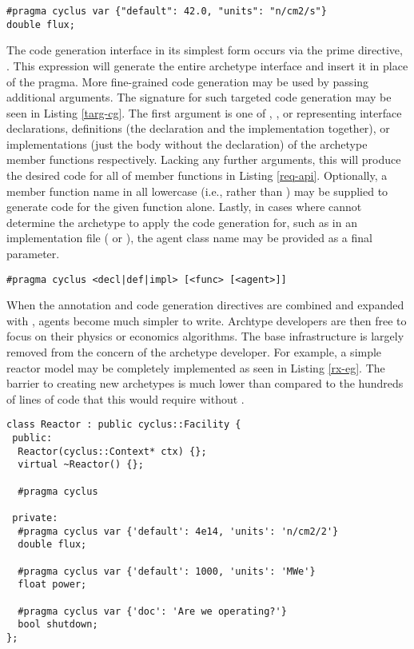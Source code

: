 \begin{lstlisting}[caption={Flux State Variable Annotation}, label=flux-pragma]
#pragma cyclus var {"default": 42.0, "units": "n/cm2/s"}
double flux;
\end{lstlisting}

The code generation interface in its simplest form occurs via the \cyclus 
prime directive, .  This expression will 
generate the entire archetype interface and insert it in place of the pragma.
More fine-grained code generation may be used by passing additional arguments.
The signature for such targeted code generation may be seen in Listing \ref{targ-cg}.
The first argument is one of , , or  representing 
interface declarations, definitions (the declaration and the implementation together), 
or implementations (just the body without the declaration) of the archetype member
functions respectively. Lacking any further arguments, this will produce the desired code for 
all of member functions in Listing \ref{req-api}.  Optionally, a member function 
name in all lowercase (i.e.,  rather than ) may 
be supplied to generate code for the given function alone.  Lastly, in 
cases where \cycpp cannot determine the archetype to apply the code generation for,
such as in an implementation file ( or ), the agent
class name may be provided as a final parameter.

\begin{lstlisting}[caption={Targeted Code Generation Directive Signatures}, 
                   label=targ-cg]
#pragma cyclus <decl|def|impl> [<func> [<agent>]]
\end{lstlisting}

When the annotation and code generation directives are combined and expanded with 
\cycpp, agents become much simpler to write.
Archtype developers are then free to focus on their physics 
or economics algorithms. The base \cyclus
infrastructure is largely removed from the concern of the archetype developer.
For example, a simple reactor model may be completely implemented as seen in 
Listing \ref{rx-eg}. The barrier to creating new archetypes is much lower than 
compared to the hundreds of lines of code that this would require without \cycpp.

\begin{lstlisting}[caption={Simple Reactor Archetype}, label=rx-eg]
class Reactor : public cyclus::Facility {
 public:
  Reactor(cyclus::Context* ctx) {};
  virtual ~Reactor() {};

  #pragma cyclus

 private:
  #pragma cyclus var {'default': 4e14, 'units': 'n/cm2/2'}
  double flux;

  #pragma cyclus var {'default': 1000, 'units': 'MWe'}
  float power;

  #pragma cyclus var {'doc': 'Are we operating?'}
  bool shutdown;
};
\end{lstlisting}

